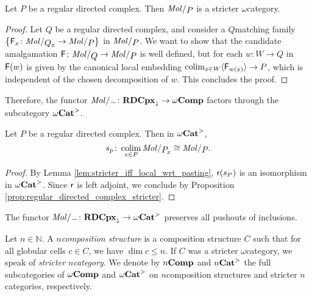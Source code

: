 \begin{prop} \label{prop:regular_directed_complex_stricter}
    Let \( P \) be a regular directed complex.
    Then \( \molecin{P} \) is a stricter \( \omega \)\nbd category.
\end{prop}
\begin{proof}
    Let \( Q \) be a regular directed complex, and consider a \( Q \)\nbd matching family \( \set{\F_x \colon \molecin{\imel{Q}{x}} \to \molecin{P}} \) in \( \molecin{P} \).
    We want to show that the candidate amalgamation \( \F \colon \molecin{Q} \to \molecin{P} \) is well defined, but for each \( w \colon W \to Q \) in \( \mathsf{F}(w) \) is given by the canonical local embedding \( \operatorname*{colim}_{x \in W} \langle\mathsf{F}_{w(x)}\rangle \to P \), which is independent of the chosen decomposition of \( w \).
    This concludes the proof.
\end{proof}

\noindent Therefore, the functor \( \molecin{-} \colon \rdcpxmap \to \Comp \) factors through the subcategory \( {\omega\mathbf{Cat}}^> \).

\begin{cor} \label{cor:regular_directed_complex_colimit_of_itself}
    Let \( P \) be a regular directed complex.
    Then in \( {\omega\mathbf{Cat}}^> \),
    \begin{equation*}
        s_p \colon \colim_{x \in P} \molecin{\imel{P}{x}} \cong \molecin{P}.
    \end{equation*}
\end{cor}
\begin{proof}
    By Lemma \ref{lem:stricter_iff_local_wrt_pasting}, \( \mathsf{r}(s_P) \) is an isomorphism in \( {\omega\mathbf{Cat}}^> \).
    Since \( \mathsf{r} \) is left adjoint, we conclude by Proposition \ref{prop:regular_directed_complex_stricter}.
\end{proof}

\begin{cor} \label{cor:molecin_preserves_pushout_inclusions}
    The functor \( \molecin{-} \colon \rdcpxmap \to \somegaCat \) preserves all pushouts of inclusions. 
\end{cor}

\begin{dfn} 
    Let \( n \in \mathbb{N} \).
    A \emph{\( n \)\nbd composition structure} is a composition structure \( C \) such that for all globular cells \( c \in C \), we have \( \dim c \le n \).
    If \( C \) was a stricter \( \omega \)\nbd category, we speak of \emph{stricter \( n \)\nbd category}.
    We denote by \( {n\mathbf{Comp}} \) and \( {n\mathbf{Cat}}^> \) the full subcategories of \( \omega\mathbf{Comp} \) and \( {\omega\mathbf{Cat}}^> \) on \( n \)\nbd composition structures and stricter \( n \)\nbd categories, respectively. 
\end{dfn}

